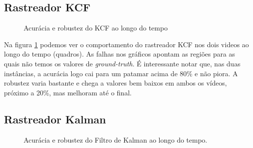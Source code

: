 \documentclass[conference]{IEEEtran}
\begin{document}
\subsection{Rastreador KCF}
\begin{figure}
\centering
{}\hfil
{}
\caption{Acurácia e robustez do KCF ao longo do tempo}
\label{kcf}
\end{figure}
Na figura \ref{kcf} podemos ver o comportamento do rastreador KCF nos dois videos ao longo do tempo (quadros).  As falhas nos gráficos apontam as regiões para as quais não temos os valores de \textit{ground-truth}. É interessante notar que, nas duas instâncias, a acurácia logo cai para um patamar acima de 80\% e não piora. A robustez varia bastante e chega a valores bem baixos em ambos os vídeos, próximo a 20\%, mas melhoram até o final.
\subsection{Rastreador Kalman}

\begin{figure}
\centering
{}\hfil
{}
\caption{Acurácia e robustez do Filtro de Kalman ao longo do tempo.}\label{kalman}
\end{figure}
\end{document}
